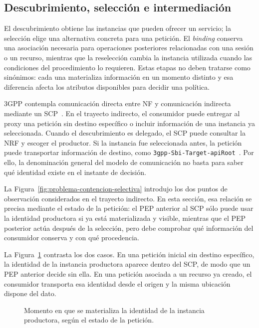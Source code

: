 \subsection{Descubrimiento, selección e intermediación}
\label{subsec:fundamentos-seleccion}

El descubrimiento obtiene las instancias que pueden ofrecer un servicio; la selección elige una alternativa concreta para una petición. El \textit{binding} conserva una asociación necesaria para operaciones posteriores relacionadas con una sesión o un recurso, mientras que la reselección cambia la instancia utilizada cuando las condiciones del procedimiento lo requieren. Estas etapas no deben tratarse como sinónimos: cada una materializa información en un momento distinto y esa diferencia afecta los atributos disponibles para decidir una política.

3GPP contempla comunicación directa entre NF y comunicación indirecta mediante un SCP~\cite{ETSI_TS_123501_R16}. En el trayecto indirecto, el consumidor puede entregar al proxy una petición sin destino específico o incluir información de una instancia ya seleccionada. Cuando el descubrimiento es delegado, el SCP puede consultar la NRF y escoger el productor. Si la instancia fue seleccionada antes, la petición puede transportar información de destino, como \texttt{3gpp-Sbi-Target-apiRoot}~\cite{ETSI_TS_129500_R16}. Por ello, la denominación general del modelo de comunicación no basta para saber qué identidad existe en el instante de decisión.

La Figura~\ref{fig:problema-contencion-selectiva} introdujo los dos puntos de observación considerados en el trayecto indirecto. En esta sección, esa relación se precisa mediante el estado de la petición: el PEP anterior al SCP sólo puede usar la identidad productora si ya está materializada y visible, mientras que el PEP posterior actúa después de la selección, pero debe comprobar qué información del consumidor conserva y con qué procedencia.

La Figura~\ref{fig:materializacion-discriminador} contrasta los dos casos. En una petición inicial sin destino específico, la identidad de la instancia productora aparece dentro del SCP, de modo que un PEP anterior decide sin ella. En una petición asociada a un recurso ya creado, el consumidor transporta esa identidad desde el origen y la misma ubicación dispone del dato.

\begin{figure}[H]
    \centering
    
    \caption{Momento en que se materializa la identidad de la instancia productora, según el estado de la petición.}
    \label{fig:materializacion-discriminador}
\end{figure}

